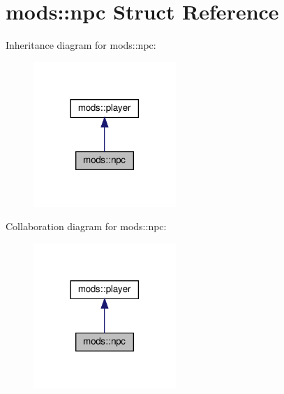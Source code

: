 \hypertarget{structmods_1_1npc}{}\section{mods\+:\+:npc Struct Reference}
\label{structmods_1_1npc}


Inheritance diagram for mods\+:\+:npc\+:
\nopagebreak
\begin{figure}[H]
\begin{center}
\leavevmode
\includegraphics[width=153pt]{structmods_1_1npc__inherit__graph}
\end{center}
\end{figure}


Collaboration diagram for mods\+:\+:npc\+:
\nopagebreak
\begin{figure}[H]
\begin{center}
\leavevmode
\includegraphics[width=153pt]{structmods_1_1npc__coll__graph}
\end{center}
\end{figure}
